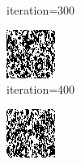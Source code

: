 \documentclass{article}
\begin{document}
\begin{figure}[h]
\begin{subfigure}[t]{0.18\textwidth}
\vspace{-0.6cm}
\caption{iteration=300}
\end{subfigure}\hspace{0.01\textwidth}
\begin{subfigure}[t]{0.18\textwidth}
\centering
\includegraphics[width=\textwidth]{./computational/results/gibbs_comb_sampler_negative_iter_400.png}
\vspace{-0.6cm}
\caption{iteration=400}
\end{subfigure}\hspace{0.01\textwidth}
\begin{subfigure}[t]{0.18\textwidth}
\centering
\includegraphics[width=\textwidth]{./computational/results/gibbs_comb_sampler_negative_iter_500.png}

\end{subfigure}
\end{figure}
\end{document}

